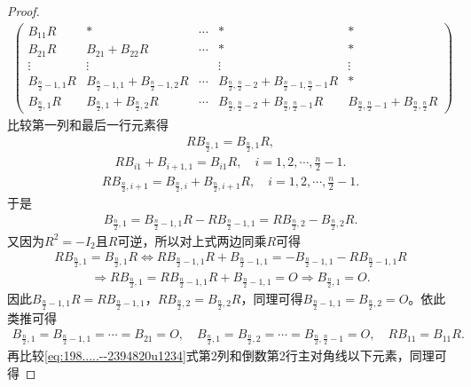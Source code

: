 \documentclass[../../main.tex]{subfiles}%
\begin{document}
\begin{proof}
\begin{align}
\begin{pmatrix}
B_{11}R & * & \cdots & * & * \\
B_{21}R & B_{21} + B_{22}R & \cdots & * & * \\
\vdots & \vdots &  & \vdots & \vdots \\
B_{\frac{n}{2}-1,1}R & B_{\frac{n}{2}-1,1} + B_{\frac{n}{2}-1,2}R & \cdots & B_{\frac{n}{2},\frac{n}{2}-2} + B_{\frac{n}{2}-1,\frac{n}{2}-1}R & * \\
B_{\frac{n}{2},1}R & B_{\frac{n}{2},1} + B_{\frac{n}{2},2}R & \cdots & B_{\frac{n}{2},\frac{n}{2}-2} + B_{\frac{n}{2},\frac{n}{2}-1}R & B_{\frac{n}{2},\frac{n}{2}-1} + B_{\frac{n}{2},\frac{n}{2}}R
\end{pmatrix} \label{eq:198.....--2394820u1234}
\end{align}
比较第一列和最后一行元素得
\begin{align*}
RB_{\frac{n}{2},1} = B_{\frac{n}{2},1}R,
\end{align*}
\begin{align*}
RB_{i1} + B_{i+1,1} = B_{i1}R, \quad i = 1,2,\cdots,\frac{n}{2}-1.
\end{align*}
\begin{align*}
RB_{\frac{n}{2},i+1} = B_{\frac{n}{2},i} + B_{\frac{n}{2},i+1}R, \quad i = 1,2,\cdots,\frac{n}{2}-1.
\end{align*}
于是
\begin{align*}
B_{\frac{n}{2},1} = B_{\frac{n}{2}-1,1}R - RB_{\frac{n}{2}-1,1} = RB_{\frac{n}{2},2} - B_{\frac{n}{2},2}R.
\end{align*}
又因为\(R^2 = -I_2\)且\(R\)可逆，所以对上式两边同乘$R$可得
\begin{align*}
RB_{\frac{n}{2},1} = B_{\frac{n}{2},1}R \Longleftrightarrow RB_{\frac{n}{2}-1,1}R + B_{\frac{n}{2}-1,1} = -B_{\frac{n}{2}-1,1} - RB_{\frac{n}{2}-1,1}R
\end{align*}
\begin{align*}
\Longrightarrow RB_{\frac{n}{2},1} = RB_{\frac{n}{2}-1,1}R + B_{\frac{n}{2}-1,1} = O \Longrightarrow B_{\frac{n}{2},1} = O.
\end{align*}
因此\(B_{\frac{n}{2}-1,1}R = RB_{\frac{n}{2}-1,1}\)，\(RB_{\frac{n}{2},2} = B_{\frac{n}{2},2}R\)，同理可得\(B_{\frac{n}{2}-1,1} = B_{\frac{n}{2},2} = O\)。依此类推可得
\begin{align*}
B_{\frac{n}{2},1} = B_{\frac{n}{2}-1,1} = \cdots = B_{21} = O, \quad B_{\frac{n}{2},1} = B_{\frac{n}{2},2} = \cdots = B_{\frac{n}{2},\frac{n}{2}-1} = O, \quad RB_{11} = B_{11}R.
\end{align*}
再比较\eqref{eq:198.....--2394820u1234}式第2列和倒数第2行主对角线以下元素，同理可得

\end{proof}
\end{document}
